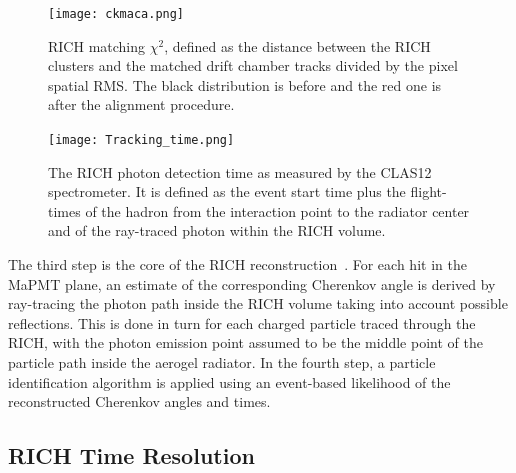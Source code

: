 \documentclass[5p,times,twocolumn]{elsarticle}
\begin{document}
\begin{figure}[t]
\begin{center}
\texttt{[image: ckmaca.png]}
\end{center}
\caption{RICH matching $\chi^2$, defined as the distance between the RICH clusters and the matched drift chamber tracks divided by the
  pixel spatial RMS. The black distribution is before and the red one is after the alignment procedure.}
\label{Fig:DCmatch}
\end{figure}

\begin{figure}[t]
\begin{center}
\texttt{[image: Tracking\_time.png]}
\end{center}
\caption{The RICH photon detection time as measured by the  CLAS12 spectrometer. It is defined as the event start
  time plus the flight-times of the hadron from the interaction point to the radiator center and of the ray-traced
  photon within the RICH volume.}
\label{Fig:Traced_Time}
\end{figure}

The third step is the core of the RICH reconstruction~\cite{recon-nim}. For each hit in the MaPMT plane, an
estimate of the corresponding Cherenkov angle is derived by ray-tracing the photon path inside the RICH volume
taking into account possible reflections. This is done in turn for each charged particle traced through the RICH, with
the photon emission point assumed to be the middle point of the particle path inside the aerogel radiator. In the fourth
step, a particle identification algorithm is applied using an event-based likelihood of the reconstructed Cherenkov
angles and times.

\subsection{RICH Time Resolution}
\label{sec:TimeCalib}
\end{document}
